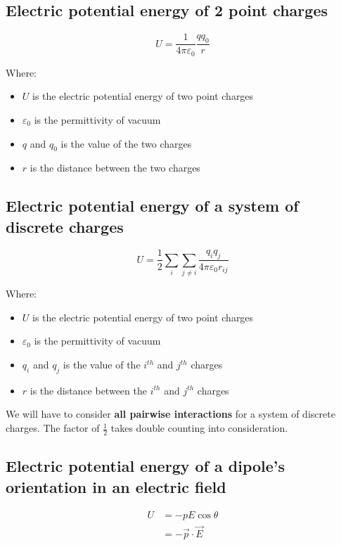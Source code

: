 \documentclass[11pt]{article}
\begin{document}
\subsection{Electric potential energy of 2 point charges}
\label{sec:org98eeca5}
\[U = \frac{1}{4 \pi \varepsilon_0} \frac{qq_0}{r}\]

Where:
\begin{itemize}
\item \(U\) is the electric potential energy of two point charges
\item \(\varepsilon_0\) is the permittivity of vacuum
\item \(q\) and \(q_0\) is the value of the two charges
\item \(r\) is the distance between the two charges
\end{itemize}

\subsection{Electric potential energy of a system of discrete charges}
\label{sec:orgdf88e6b}
\[U = \frac{1}{2} \sum_{i} \sum_{j \ne i} \frac{q_i q_j}{4 \pi \varepsilon_0 r_{ij}}\]

Where:
\begin{itemize}
\item \(U\) is the electric potential energy of two point charges
\item \(\varepsilon_0\) is the permittivity of vacuum
\item \(q_i\) and \(q_j\) is the value of the \(i^{th}\) and \(j^{th}\) charges
\item \(r\) is the distance between the \(i^{th}\) and \(j^{th}\) charges
\end{itemize}

We will have to consider \textbf{all pairwise interactions} for a system of discrete charges. The factor of \(\frac{1}{2}\) takes double counting into consideration.

\newpage

\subsection{Electric potential energy of a dipole's orientation in an electric field}
\label{sec:orge2fc372}
\begin{align*}
U &= - p E \cos \theta \\
&= - \vec{p} \cdot \vec{E}
\end{align*}
\end{document}
